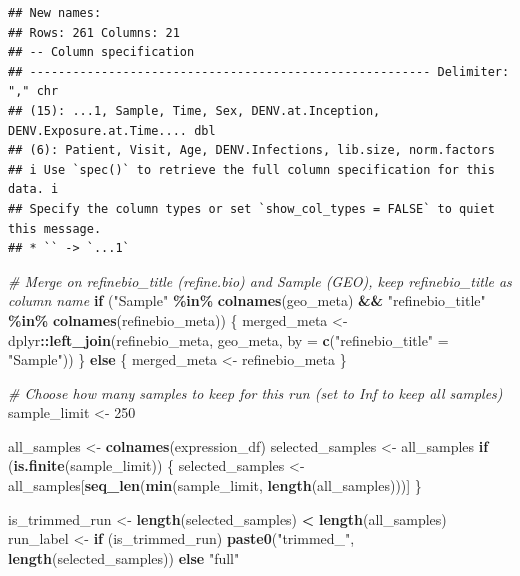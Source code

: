 \documentclass[
]{article}
\newenvironment{Shaded}{\begin{snugshade}}{\end{snugshade}}
\newcommand{\AttributeTok}[1]{\textcolor[rgb]{0.13,0.29,0.53}{#1}}
\newcommand{\CommentTok}[1]{\textcolor[rgb]{0.56,0.35,0.01}{\textit{#1}}}
\newcommand{\ControlFlowTok}[1]{\textcolor[rgb]{0.13,0.29,0.53}{\textbf{#1}}}
\newcommand{\DecValTok}[1]{\textcolor[rgb]{0.00,0.00,0.81}{#1}}
\newcommand{\FunctionTok}[1]{\textcolor[rgb]{0.13,0.29,0.53}{\textbf{#1}}}
\newcommand{\NormalTok}[1]{#1}
\newcommand{\OtherTok}[1]{\textcolor[rgb]{0.56,0.35,0.01}{#1}}
\newcommand{\SpecialCharTok}[1]{\textcolor[rgb]{0.81,0.36,0.00}{\textbf{#1}}}
\newcommand{\StringTok}[1]{\textcolor[rgb]{0.31,0.60,0.02}{#1}}
\begin{document}
\begin{verbatim}
## New names:
## Rows: 261 Columns: 21
## -- Column specification
## -------------------------------------------------------- Delimiter: "," chr
## (15): ...1, Sample, Time, Sex, DENV.at.Inception, DENV.Exposure.at.Time.... dbl
## (6): Patient, Visit, Age, DENV.Infections, lib.size, norm.factors
## i Use `spec()` to retrieve the full column specification for this data. i
## Specify the column types or set `show_col_types = FALSE` to quiet this message.
## * `` -> `...1`
\end{verbatim}

\begin{Shaded}
\begin{Highlighting}[]
\CommentTok{\# Merge on \textquotesingle{}refinebio\_title\textquotesingle{} (refine.bio) and \textquotesingle{}Sample\textquotesingle{} (GEO), keep \textquotesingle{}refinebio\_title\textquotesingle{} as column name}
\ControlFlowTok{if}\NormalTok{ (}\StringTok{"Sample"} \SpecialCharTok{\%in\%} \FunctionTok{colnames}\NormalTok{(geo\_meta) }\SpecialCharTok{\&\&} \StringTok{"refinebio\_title"} \SpecialCharTok{\%in\%} \FunctionTok{colnames}\NormalTok{(refinebio\_meta)) \{}
\NormalTok{  merged\_meta }\OtherTok{\textless{}{-}}\NormalTok{ dplyr}\SpecialCharTok{::}\FunctionTok{left\_join}\NormalTok{(refinebio\_meta, geo\_meta, }\AttributeTok{by =} \FunctionTok{c}\NormalTok{(}\StringTok{"refinebio\_title"} \OtherTok{=} \StringTok{"Sample"}\NormalTok{))}
\NormalTok{\} }\ControlFlowTok{else}\NormalTok{ \{}
\NormalTok{  merged\_meta }\OtherTok{\textless{}{-}}\NormalTok{ refinebio\_meta}
\NormalTok{\}}

\CommentTok{\# Choose how many samples to keep for this run (set to Inf to keep all samples)}
\NormalTok{sample\_limit }\OtherTok{\textless{}{-}} \DecValTok{250}

\NormalTok{all\_samples }\OtherTok{\textless{}{-}} \FunctionTok{colnames}\NormalTok{(expression\_df)}
\NormalTok{selected\_samples }\OtherTok{\textless{}{-}}\NormalTok{ all\_samples}
\ControlFlowTok{if}\NormalTok{ (}\FunctionTok{is.finite}\NormalTok{(sample\_limit)) \{}
\NormalTok{  selected\_samples }\OtherTok{\textless{}{-}}\NormalTok{ all\_samples[}\FunctionTok{seq\_len}\NormalTok{(}\FunctionTok{min}\NormalTok{(sample\_limit, }\FunctionTok{length}\NormalTok{(all\_samples)))]}
\NormalTok{\}}

\NormalTok{is\_trimmed\_run }\OtherTok{\textless{}{-}} \FunctionTok{length}\NormalTok{(selected\_samples) }\SpecialCharTok{\textless{}} \FunctionTok{length}\NormalTok{(all\_samples)}
\NormalTok{run\_label }\OtherTok{\textless{}{-}} \ControlFlowTok{if}\NormalTok{ (is\_trimmed\_run) }\FunctionTok{paste0}\NormalTok{(}\StringTok{"trimmed\_"}\NormalTok{, }\FunctionTok{length}\NormalTok{(selected\_samples)) }\ControlFlowTok{else} \StringTok{"full"}


\end{Highlighting}
\end{Shaded}
\end{document}
